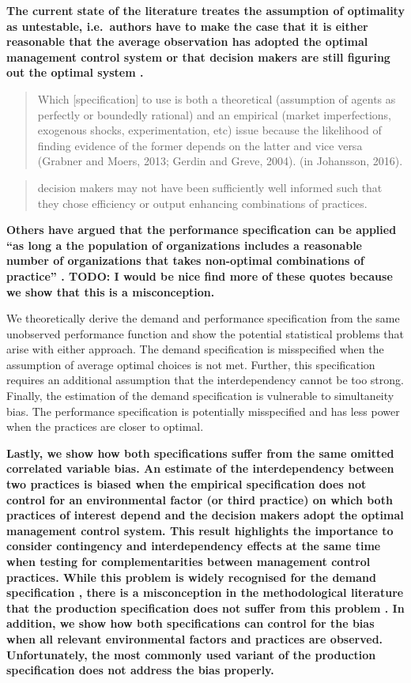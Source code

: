 \documentclass[12pt]{article}
\begin{document}
\textbf{The current state of the literature treates the assumption of
optimality as untestable, i.e.~authors have to make the case that it is
either reasonable that the average observation has adopted the optimal
management control system or that decision makers are still figuring out
the optimal system \citep{Grabner2013}.}

\begin{quote}
Which {[}specification{]} to use is both a theoretical (assumption of
agents as perfectly or boundedly rational) and an empirical (market
imperfections, exogenous shocks, experimentation, etc) issue because the
likelihood of finding evidence of the former depends on the latter and
vice versa (Grabner and Moers, 2013; Gerdin and Greve, 2004). (in
Johansson, 2016).
\end{quote}

\begin{quote}
decision makers may not have been sufficiently well informed such that
they chose efficiency or output enhancing combinations of practices.
\citep{Carree2011}
\end{quote}

\textbf{Others have argued that the performance specification can be
applied ``as long a the population of organizations includes a
reasonable number of organizations that takes non-optimal combinations
of practice'' \citep{Carree2011}. TODO: I would be nice find more of
these quotes because we show that this is a misconception.}

We theoretically derive the demand and performance specification from
the same unobserved performance function and show the potential
statistical problems that arise with either approach. The demand
specification is misspecified when the assumption of average optimal
choices is not met. Further, this specification requires an additional
assumption that the interdependency cannot be too strong. Finally, the
estimation of the demand specification is vulnerable to simultaneity
bias. The performance specification is potentially misspecified and has
less power when the practices are closer to optimal.

\textbf{Lastly, we show how both specifications suffer from the same
omitted correlated variable bias. An estimate of the interdependency
between two practices is biased when the empirical specification does
not control for an environmental factor (or third practice) on which
both practices of interest depend and the decision makers adopt the
optimal management control system. This result highlights the importance
to consider contingency and interdependency effects at the same time
when testing for complementarities between management control practices.
While this problem is widely recognised for the demand specification
\citep[\citet{Grabner2013}]{Arora1996}, there is a misconception in the
methodological literature that the production specification does not
suffer from this problem \citep{Carree2011}. In addition, we show how
both specifications can control for the bias when all relevant
environmental factors and practices are observed. Unfortunately, the
most commonly used variant of the production specification does not
address the bias properly.}
\end{document}
